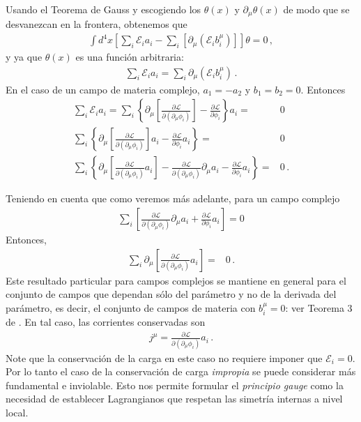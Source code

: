 Usando el Teorema de Gauss y escogiendo los $\theta(x)$ y $\partial_{\mu}\theta(x)$ de modo que se desvanezcan en la frontera, obtenemos que
\begin{align*}
\int {d^4}x \left[    \sum_i  \mathcal{E}_ia_i -\sum_i  \left[ \partial_{\mu}   \left(  \mathcal{E}_i b^{\mu}_i  \right) \right] \right]\theta   =0\,,
\end{align*}
y ya que $\theta(x)$ es una función arbitraria:
\begin{align}
  \sum_i \mathcal{E}_ia_i=\sum_i  \partial_{\mu}   \left(  \mathcal{E}_i b^{\mu}_i  \right) \,.
\end{align}
En el caso de un campo de materia complejo, $a_1=-a_2$ y $b_1=b_2=0$. Entonces
\begin{align}
 \sum_i \mathcal{E}_ia_i=\sum_i \left\{ \partial_{\mu} \left[ \frac{\partial\mathcal{L}}{\partial(\partial_{\mu}\phi_i)}\right]-\frac{\partial\mathcal{L}}{\partial\phi_i} \right\}a_i=&0 \nonumber\\
\sum_i \left\{ \partial_{\mu} \left[ \frac{\partial\mathcal{L}}{\partial(\partial_{\mu}\phi_i)}\right]a_i-\frac{\partial\mathcal{L}}{\partial\phi_i}a_i \right\}=&0 \nonumber\\
\sum_i \left\{ \partial_{\mu} \left[ \frac{\partial\mathcal{L}}{\partial(\partial_{\mu}\phi_i)}a_i\right]-\frac{\partial\mathcal{L}}{\partial(\partial_{\mu}\phi_i)}\partial_{\mu}a_i-\frac{\partial\mathcal{L}}{\partial\phi_i}a_i \right\}=&0 \,.
\end{align}

\begin{frame}
Teniendo en cuenta que como veremos más adelante, para un campo complejo
\begin{align}
\sum_i \left[\frac{\partial\mathcal{L}}{\partial(\partial_{\mu}\phi_i)}\partial_{\mu}a_i+\frac{\partial\mathcal{L}}{\partial\phi_i}a_i \right]=0
\end{align}
Entonces, 
\begin{align}
\sum_i \partial_{\mu} \left[ \frac{\partial\mathcal{L}}{\partial(\partial_{\mu}\phi_i)}a_i\right]=&0\,.
\end{align}
Este resultado particular para campos complejos se mantiene en general para el conjunto de campos que dependan sólo del parámetro y no de la derivada del parámetro, es decir, el conjunto de campos de materia con $b_i^\mu=0$: ver Teorema 3 de \cite{Brading:2000hc}. En tal caso, las corrientes conservadas son
\begin{align}
\label{eq:tnoeth2}
j^\mu=\frac{\partial\mathcal{L}}{\partial(\partial_{\mu}\phi_i)}a_{i}\,.
\end{align}
Note que la conservación de la carga en este caso no requiere imponer que $\mathcal{E}_i=0$. Por lo tanto el caso de la conservación de carga \emph{impropia} se puede considerar más fundamental e inviolable. Esto nos permite formular el \emph{principio gauge} como la necesidad de establecer Lagrangianos que respetan las simetría internas a nivel local.
\end{frame}

